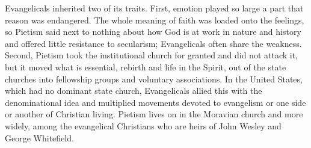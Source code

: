 Evangelicals inherited two of its traits. First, emotion played so large a part that reason was
endangered. The whole meaning of faith was loaded onto the feelings, so Pietism said next to nothing about how God is at work in nature and history and offered little resistance to secularism; Evangelicals often
share the weakness. Second, Pietism took the institutional church for granted and did not attack it,
but it moved what is essential, rebirth and life in the Spirit, out of the state churches into
fellowship groups and voluntary associations. In the United States, which had no dominant state church,
Evangelicals allied this with the denominational idea and multiplied movements devoted to evangelism or one side or another of Christian living. Pietism lives on in the Moravian church and more widely, among the evangelical Christians who are heirs of John Wesley and George Whitefield.

\begin{keyfacts}
\end{keyfacts}
